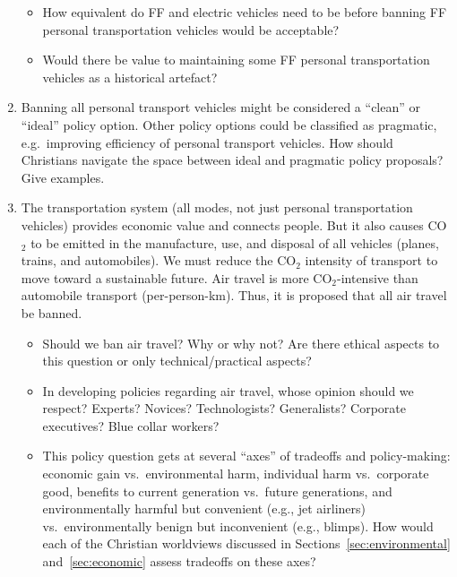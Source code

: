 \documentclass[12pt]{article}
\begin{document}
\begin{enumerate}
		\begin{itemize}

		  \item How equivalent do FF and electric vehicles need to be before banning FF
		        personal transportation vehicles would be acceptable?
		
		  \item Would there be value to maintaining some FF personal transportation vehicles 
		        as a historical artefact? 

		\end{itemize}
		
  \item Banning all personal transport vehicles might be considered a ``clean'' or ``ideal'' policy option.
        Other policy options could be classified as pragmatic, 
		e.g.\ improving efficiency of personal transport vehicles.
		How should Christians navigate the space between ideal and pragmatic policy proposals? 
		Give examples.

  \item The transportation system (all modes, not just personal transportation vehicles) 
        provides economic value and connects people. 
        But it also causes CO$_2$ to be emitted in the manufacture, use, and disposal 
		of all vehicles (planes, trains, and automobiles). 
		We must reduce the CO$_2$ intensity of transport to move toward a sustainable future. 
		Air travel is more CO$_2$-intensive than automobile transport (per-person-km). 
		Thus, it is proposed that all air travel be banned.

		\begin{itemize}

		  \item Should we ban air travel? 
		        Why or why not? 
				Are there ethical aspects to this question or 
				only technical/practical aspects? 

		  \item In developing policies regarding air travel, whose opinion should we respect? 
		        Experts? Novices? 
				Technologists? Generalists? 
				Corporate executives? Blue collar workers?
				
  		  \item This policy question gets at several “axes” of tradeoffs and policy-making:
		        economic gain vs.\ environmental harm, 
				individual harm vs.\ corporate good, 
				benefits to current generation vs.\ future generations, and 
				environmentally harmful but convenient (e.g., jet airliners) vs.\ 
			    environmentally benign but inconvenient (e.g., blimps).
				How would each of the Christian worldviews discussed in Sections~\ref{sec:environmental}
				and~\ref{sec:economic} assess tradeoffs on these axes?
				

\end{itemize}
\end{enumerate}
\end{document}
